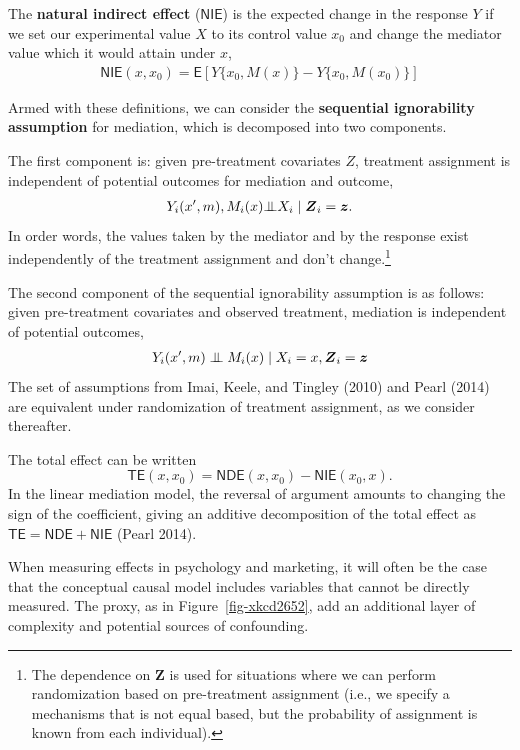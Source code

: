 \documentclass[
  11pt,
  letterpaper,
]{scrbook}
\theoremstyle{definition}
\theoremstyle{remark}
\begin{document}
The \textbf{natural indirect effect} (\(\mathsf{NIE}\)) is the expected
change in the response \(Y\) if we set our experimental value \(X\) to
its control value \(x_0\) and change the mediator value which it would
attain under \(x\), \begin{align*}
\textsf{NIE}(x, x_0) = \mathsf{E}[Y\{x_0, M(x)\} - Y\{x_0,  M(x_0)\}]
\end{align*}

Armed with these definitions, we can consider the \textbf{sequential
ignorability assumption} for mediation, which is decomposed into two
components.

The first component is: given pre-treatment covariates \(Z\), treatment
assignment is independent of potential outcomes for mediation and
outcome, \begin{align*}
Y_i(x', m), M_i(x) {\perp\mkern-10mu\perp} X_i \mid \boldsymbol{Z}_i = \boldsymbol{z}.
\end{align*} In order words, the values taken by the mediator and by the
response exist independently of the treatment assignment and don't
change.\footnote{The dependence on \(\boldsymbol{Z}\) is used for
  situations where we can perform randomization based on pre-treatment
  assignment (i.e., we specify a mechanisms that is not equal based, but
  the probability of assignment is known from each individual).}

The second component of the sequential ignorability assumption is as
follows: given pre-treatment covariates and observed treatment,
mediation is independent of potential outcomes, \begin{align*}
Y_i(x', m) \perp\mkern-10mu\perp  M_i(x) \mid X_i =x, \boldsymbol{Z}_i = \boldsymbol{z}
\end{align*} The set of assumptions from Imai, Keele, and Tingley (2010)
and Pearl (2014) are equivalent under randomization of treatment
assignment, as we consider thereafter.

The total effect can be written
\[\mathsf{TE}(x, x_0) = \mathsf{NDE}(x, x_0) - \mathsf{NIE}(x_0, x).\]
In the linear mediation model, the reversal of argument amounts to
changing the sign of the coefficient, giving an additive decomposition
of the total effect as \(\mathsf{TE} = \mathsf{NDE} + \mathsf{NIE}\)
(Pearl 2014).

When measuring effects in psychology and marketing, it will often be the
case that the conceptual causal model includes variables that cannot be
directly measured. The proxy, as in Figure~\ref{fig-xkcd2652}, add an
additional layer of complexity and potential sources of confounding.
\end{document}
